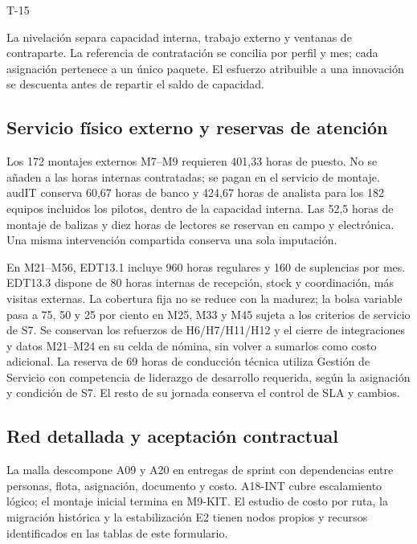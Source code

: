 \begin{formulario}{T-15}

La nivelación separa capacidad interna, trabajo externo y ventanas de contraparte. La referencia
de contratación se concilia por perfil y mes; cada asignación pertenece a un único paquete.
El esfuerzo atribuible a una innovación se descuenta antes de repartir el saldo de capacidad.



\subsection*{Servicio físico externo y reservas de atención}

Los 172 montajes externos M7--M9 requieren 401,33 horas de puesto. No se añaden a las horas
internas contratadas; se pagan en el servicio de montaje. audIT conserva 60,67 horas de banco
y 424,67 horas de analista para los 182 equipos incluidos los pilotos, dentro de la capacidad
interna. Las 52,5 horas de montaje de balizas y diez horas de lectores se reservan en campo y
electrónica. Una misma intervención compartida conserva una sola imputación.

En M21--M56, EDT13.1 incluye 960 horas regulares y 160 de suplencias por mes. EDT13.3 dispone
de 80 horas internas de recepción, stock y coordinación, más visitas externas. La cobertura fija
no se reduce con la madurez; la bolsa variable pasa a 75, 50 y 25 por ciento en M25, M33 y M45
sujeta a los criterios de servicio de S7. Se conservan los refuerzos de H6/H7/H11/H12 y el cierre
de integraciones y datos M21--M24 en su celda de nómina, sin volver a sumarlos como costo adicional. La reserva de 69 horas de conducción técnica utiliza Gestión de Servicio con competencia de liderazgo de desarrollo requerida, según la asignación y condición de S7. El resto de su jornada conserva el control de SLA y cambios.

\subsection*{Red detallada y aceptación contractual}

La malla descompone A09 y A20 en entregas de sprint con dependencias entre personas, flota,
asignación, documento y costo. A18-INT cubre escalamiento lógico; el montaje inicial termina
en M9-KIT. El estudio de costo por ruta, la migración histórica y la estabilización E2 tienen
nodos propios y recursos identificados en las tablas de este formulario.



\end{formulario}

